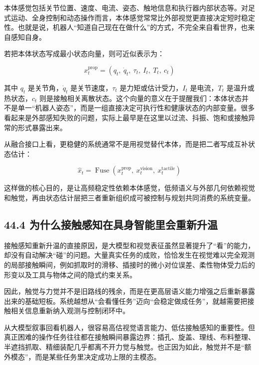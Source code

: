 本体感觉包括关节位置、速度、电流、姿态、触地信息和执行器内部状态等。对足式运动、全身控制和动态操作而言，本体感觉常常比外部视觉更直接决定短时稳定性。也就是说，机器人“知道自己现在在做什么”的方式，不完全来自看世界，也来自感知自身。

若把本体状态写成最小状态向量，则可近似表示为：

\begingroup
\footnotesize
\begin{equation*}
x_t^{\text{prop}} = (q_t,\ \dot q_t,\ \tau_t,\ I_t,\ T_t,\ c_t)
\end{equation*}
\endgroup

其中 \(q_t\) 是关节角，\(\dot q_t\) 是关节速度，\(\tau_t\) 是力矩或估计受力，\(I_t\) 是电流，\(T_t\) 是温升或热状态，\(c_t\) 则是接触相关离散状态。这个向量的意义在于提醒我们：本体状态并不是单一“机器人姿态”，而是一组直接决定可执行性和健康状态的内部变量。很多看起来是外部感知失败的问题，实际上最早是在这里以过流、抖振、饱和或接触异常的形式暴露出来。

从融合接口上看，更稳健的系统通常不是用视觉替代本体，而是把二者写成互补状态估计：

\begingroup
\scriptsize
\begin{equation*}
\hat x_t = \operatorname{Fuse}(x_t^{\text{prop}},\ x_t^{\text{vision}},\ x_t^{\text{tactile}})
\end{equation*}
\endgroup

这样做的核心目的，是让高频稳定性依赖本体感觉，低频语义与外部几何依赖视觉和触觉，再由状态估计层把三者重新组织成可被控制与规划共同消费的系统变量。

\subsection*{44.4 为什么接触感知在具身智能里会重新升温}


接触感知重新升温的直接原因，是大模型和视觉表征虽然显著提升了“看”的能力，却没有自动解决“碰”的问题。大量真实任务的成败，恰恰发生在视觉难以完全观测的局部接触瞬间，例如抓取时的滑移、插接时的微小对位误差、柔性物体受力后的形变以及工具与物体之间的隐式约束关系。

因此，触觉与力觉并不是旧路线的残余，而是在更高层语义能力增强之后重新暴露出来的基础短板。系统越想从“会看懂任务”迈向“会稳定做成任务”，就越需要把接触相关信息重新纳入观测与控制闭环中。

从大模型叙事回看机器人，很容易高估视觉语言能力、低估接触感知的重要性。但真正困难的操作任务往往都在接触瞬间暴露边界：插孔、旋盖、理线、布料整理、半遮挡抓取、精细装配几乎都离不开力觉与触觉。也正因为如此，触觉并不是“额外模态”，而是某些任务里决定成功上限的主模态。

